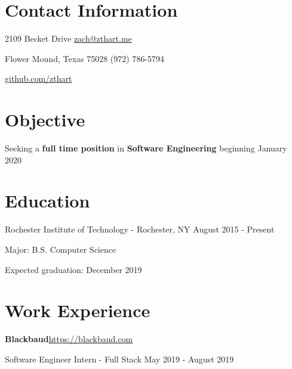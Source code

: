 \documentclass[margin,line]{resume}
\newcommand{\rurl}[1]{\hfill {\footnotesize \url{#1}}}
\newcommand{\rdate}[1]{\hfill {\small #1}}
\begin{document}
\begin{resume}
\section{\mysidestyle Contact Information}
	\begin{asparablank}
		\item 2109 Becket Drive  \hfill \href{mailto:zach@zthart.me}{zach@zthart.me}
		\item Flower Mound, Texas 75028 \hfill (972) 786-5794
		\item \hfill \rurl{github.com/zthart}
    \end{asparablank}

\section{\mysidestyle Objective}
	\begin{asparablank}
	\item Seeking a \textbf{full time position} in \textbf{Software Engineering} beginning January 2020
        \normalsize
        \\
	\end{asparablank}

\section{\mysidestyle Education}
	\begin{compactdesc}
		\item[Rochester Institute of Technology] - Rochester, NY \rdate{August 2015 - Present}
		\begin{compactitem} { \small
			\item Major: B.S. Computer Science
			\item Expected graduation: December 2019
		} \end{compactitem}
	\end{compactdesc}


\section{\mysidestyle Work Experience}
	\begin{asparablank}
	\item{\bf Blackbaud}\rurl{https://blackbaud.com}
	\small \item Software Engineer Intern - Full Stack \hfill May 2019 - August 2019 \\


\end{asparablank}
\end{resume}
\end{document}
